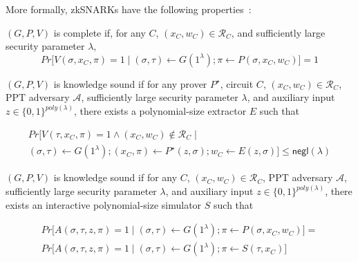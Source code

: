 More formally, zkSNARKs have the following properties~\cite{snark_defn,groth_snark}:

\begin{definition}[Completeness]
    $(G, P, V)$ is complete if, for any $C$, $(x_C, w_C) \in \mathcal{R}_C$, and sufficiently large security parameter $\lambda$,
    $$
        Pr \bigl[V(\sigma, x_C, \pi) = 1 \mid (\sigma, \tau) \gets G(1^{\lambda}); \pi \gets P(\sigma, x_C, w_C) \bigr] = 1
    $$
\end{definition}

\begin{definition}
    $(G, P, V)$ is knowledge sound if for any prover $P^{\star}$, circuit $C$, $(x_C, w_C) \in \mathcal{R}_C$, PPT adversary $\mathcal{A}$, sufficiently large security parameter $\lambda$, and auxiliary input $z \in \{0, 1\}^{poly(\lambda)}$, there exists a polynomial-size extractor $E$ such that

    \begin{equation*}
        \begin{multlined}
            Pr\bigl[V(\tau, x_C, \pi) = 1 \land (x_C, w_C) \notin \mathcal{R}_C \mid \\
                (\sigma, \tau) \gets G(1^{\lambda});
                (x_C, \pi) \gets P^{\star}(z, \sigma);
                w_C \gets E(z, \sigma)
            \bigr] \leq \textsf{negl}(\lambda)
        \end{multlined}
    \end{equation*}
\end{definition}

\begin{definition}
    $(G, P, V)$ is knowledge sound if for any $C$, $(x_C, w_C) \in \mathcal{R}_C$, PPT adversary $\mathcal{A}$, sufficiently large security parameter $\lambda$, and auxiliary input $z \in \{0, 1\}^{poly(\lambda)}$, there exists an interactive polynomial-size simulator $S$ such that

    \begin{equation*}
        \begin{multlined}
            Pr\bigl[A(\sigma, \tau, z, \pi) = 1 \mid (\sigma, \tau) \gets G(1^{\lambda}); \pi \gets P(\sigma, x_C, w_C) \bigr] = \\
            Pr\bigl[A(\sigma, \tau, z, \pi) = 1 \mid (\sigma, \tau) \gets G(1^{\lambda}); \pi \gets S(\tau, x_C) \bigr]
        \end{multlined}
    \end{equation*}
\end{definition}

